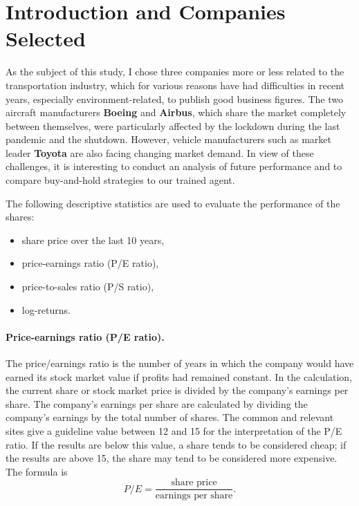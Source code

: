 \section{Introduction and Companies Selected}

As the subject of this study, I chose three companies more or less related to the
transportation industry, which for various reasons have had difficulties in recent
years, especially environment-related, to publish good business figures. The two
aircraft manufacturers \textbf{Boeing} and \textbf{Airbus}, which share the market
completely between themselves, were particularly affected by the lockdown during the
last pandemic and the shutdown. However, vehicle manufacturers such as market leader
\textbf{Toyota} are also facing changing market demand. In view of these challenges, it
is interesting to conduct an analysis of future performance and to compare buy-and-hold
strategies to our trained agent.

The following descriptive statistics are used to evaluate the performance of the shares:
\begin{itemize}
  \item share price over the last 10 years,
  \item price-earnings ratio (P/E ratio),
  \item price-to-sales ratio (P/S ratio),
  \item log-returns.
\end{itemize}

\paragraph{Price-earnings ratio (P/E ratio).}
The price/earnings ratio is the number of years in which the company would have earned
its stock market value if profits had remained constant. In the calculation, the current
share or stock market price is divided by the company's earnings per share. The
company's earnings per share are calculated by dividing the company's earnings by the
total number of shares. The common and relevant sites give a guideline value between 12
and 15 for the interpretation of the P/E ratio. If the results are below this value, a
share tends to be considered cheap; if the results are above 15, the share may tend to be
considered more expensive. The formula is
\begin{equation}
  P/E = \frac{\text{share price}}{\text{earnings per share}}.
\end{equation}

